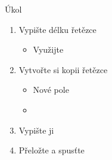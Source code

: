 \begin{frame}{Úkol}

  \begin{enumerate}
    \item Vypište délku řetězce
    \begin{itemize}
      \item Využijte 
    \end{itemize}

    \item Vytvořte si kopii řetězce
    \begin{itemize}
      \item Nové pole
      \item {}
    \end{itemize}

    \item Vypište ji
    \item Přeložte a spusťte
  \end{enumerate}

\end{frame}

